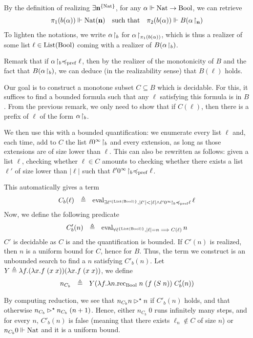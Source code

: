 \documentclass[a4paper,UKenglish,cleveref, autoref, thm-restate]{lipics-v2021}
\begin{document}
By the definition of realizing $\exists \mathbf{n}^{\{\mathrm{Nat}\}}$, for any $\alpha \Vdash \mathrm{Nat} \to \mathrm{Bool}$, we can retrieve
\[\pi_1(b(\alpha))\Vdash \mathrm{Nat}(\mathbf{n})\quad\text{such that}\quad \pi_2(b(\alpha))\Vdash B({\alpha}\!\upharpoonright_{\mathbf{n}})\]
To lighten the notations, we write ${\alpha}\!\upharpoonright_{b}$ for ${\alpha}\!\upharpoonright_{\pi_1(b(\alpha))}$, which is thus a realizer of some list $\ell \in \mathrm{List}(\mathrm{Bool})$ coming with a realizer of $B({\alpha}\!\upharpoonright_{b})$.

Remark that if ${\alpha}\!\upharpoonright_{b}\preccurlyeq_{\mathrm{pref}}\ell$, then by the realizer of the monotonicity of $B$ and the fact that $B({\alpha}\!\upharpoonright_{b})$, we can deduce (in the realizability sense) that $B(\ell)$ holds.

Our goal is to construct a monotone subset $C\subseteq B$ which is decidable. For this, it suffices to find a bounded formula such that any $\ell$ satisfying this formula is in $B$. From the previous remark, we only need to show that if $C(\ell)$, then there is a prefix of $\ell$ of the form ${\alpha}\!\upharpoonright_{b}$.

We then use this with a bounded quantification: we enumerate every list $\ell$ and, each time, add to $C$ the list ${\ell0^\infty}\!\upharpoonright_{b}$ and every extension, as long as those extensions are of size lower than $\ell$. This can also be rewritten as follows: given a list $\ell$, checking whether $\ell \in C$ amounts to checking whether there exists a list $\ell'$ of size lower than $|\ell|$ such that ${\ell'0^\infty}\!\upharpoonright_{b}\preccurlyeq_{\mathrm{pref}} \ell$.

This automatically gives a term
\[C_b(\ell) ~~\triangleq~~ \mathrm{eval}_{\exists \ell'^{\{\mathrm{List}(\mathrm{Bool})\}}, |\ell'| < |\ell| \land {\ell'0^\infty}\!\upharpoonright_{b} \preccurlyeq_{\mathrm{pref}} \ell}\,\ell\]
Now, we define the following predicate
\[C'_b(n) ~~\triangleq~~ \mathrm{eval}_{\forall \ell^{\{\mathrm{List}(\mathrm{Bool})\}}, |\ell| = n \implies C(\ell)}\, n\]
$C'$ is decidable as $C$ is and the quantification is bounded. If $C'(n)$ is realized, then $n$ is a uniform bound for $C$, hence for $B$. Thus, the term we construct is an unbounded search to find a $n$ satisfying $C'_b(n)$. Let $Y \triangleq \lambda f.(\lambda x.f\;(x\;x))(\lambda x.f\;(x\;x))$, we define
\[n_{C_b} ~~\triangleq~~ Y(\lambda f.\lambda n.\mathrm{rec}_{\mathrm{Bool}}\;n\;(f\;(S\;n))\;C'_b(n))\]

\begin{remark}\label{rmk:termin_FT}
  By computing reduction, we see that $n_{C_b} n \rhd^{\star} n$ if $C'_b(n)$ holds, and that otherwise $n_{C_b} \rhd^{\star} n_{C_b}\;(n+1)$.
  Hence, either $n_{C_b}\;0$ runs infinitely many steps, and for every $n$, $C'_b(n)$ is false (meaning that there exists $\ell_n \notin C$ of size $n$) or $n_{C_b} 0 \Vdash \mathrm{Nat}$ and it is a uniform bound.
\end{remark}
\end{document}
